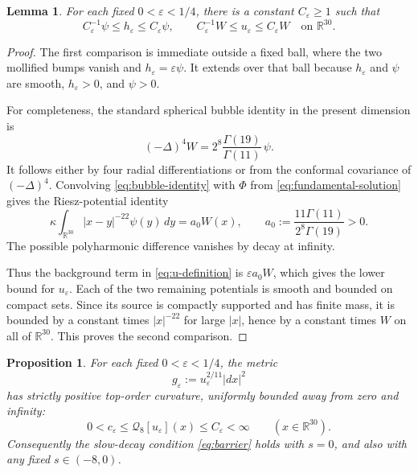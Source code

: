 \documentclass[11pt,reqno]{amsart}
\newtheorem{proposition}[theorem]{Proposition}
\newtheorem{lemma}[theorem]{Lemma}
\theoremstyle{remark}
\newcommand{\R}{\mathbb{R}}
\newcommand{\Qlx}{\mathcal{Q}}
\newcommand{\eps}{\varepsilon}
\begin{document}
\begin{lemma}\label{lem:comparison}
For each fixed \(0<\eps<1/4\), there is a constant
\(C_\eps\geq1\) such that
\begin{equation}\label{eq:comparisons}
 C_\eps^{-1}\psi\leq h_\eps\leq C_\eps\psi,
 \qquad
 C_\eps^{-1}W\leq u_\eps\leq C_\eps W
 \quad\text{on }\R^{30}.
\end{equation}
\end{lemma}

\begin{proof}
The first comparison is immediate outside a fixed ball, where the two
mollified bumps vanish and \(h_\eps=\eps\psi\).  It extends over that ball
because \(h_\eps\) and \(\psi\) are smooth, \(h_\eps>0\), and
\(\psi>0\).

For completeness, the standard spherical bubble identity in the present
dimension is
\begin{equation}\label{eq:bubble-identity}
 (-\Delta)^4W
 =2^8\frac{\Gamma(19)}{\Gamma(11)}\,\psi.
\end{equation}
It follows either by four radial differentiations or from the conformal
covariance of \((-\Delta)^4\).  Convolving \eqref{eq:bubble-identity}
with \(\Phi\) from \eqref{eq:fundamental-solution} gives the Riesz-potential
identity
\begin{equation}\label{eq:background-potential}
 \kappa\int_{\R^{30}}|x-y|^{-22}\psi(y)\,dy
 =a_0W(x),
 \qquad
 a_0:=\frac{11\Gamma(11)}{2^8\Gamma(19)}>0.
\end{equation}
The possible polyharmonic difference vanishes by decay at infinity.

Thus the background term in \eqref{eq:u-definition} is
\(\eps a_0W\), which gives the lower bound for \(u_\eps\).  Each of the
two remaining potentials is smooth and bounded on compact sets.  Since
its source is compactly supported and has finite mass, it is bounded by
a constant times \(|x|^{-22}\) for large \(|x|\), hence by a constant
times \(W\) on all of \(\R^{30}\).  This proves the second comparison.
\end{proof}

\begin{proposition}\label{prop:top-curvature}
For each fixed \(0<\eps<1/4\), the metric
\begin{equation}\label{eq:g-epsilon}
 g_\eps:=u_\eps^{2/11}|dx|^2
\end{equation}
has strictly positive top-order curvature, uniformly bounded away from
zero and infinity:
\begin{equation}\label{eq:q8-bounds}
 0<c_\eps\leq \Qlx_8[u_\eps](x)\leq C_\eps<\infty
 \qquad(x\in\R^{30}).
\end{equation}
Consequently the slow-decay condition \eqref{eq:barrier} holds with
\(s=0\), and also with any fixed \(s\in(-8,0)\).
\end{proposition}
\end{document}
